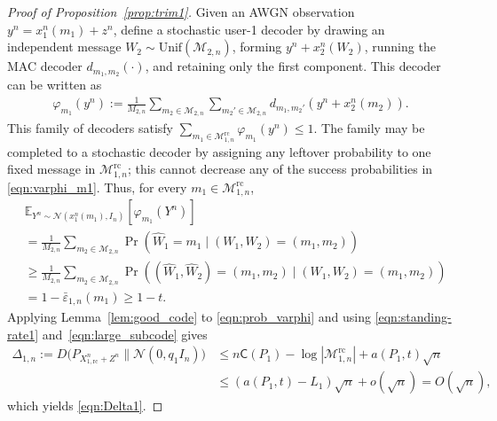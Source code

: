 \documentclass[11pt,onecolumn]{IEEEtran}
\newcommand{\nn}{\nonumber}
\newcommand{\calM}{\mathcal{M}}
\newcommand{\calN}{\mathcal{N}}
\newcommand{\bbE}{\mathbb{E}}
\newcommand{\rvC}{\mathsf{C}}
\newcommand{\eps}{\varepsilon}
\newcommand{\rc}{\mathrm{rc}}
\begin{document}
\begin{proof}[Proof of Proposition~\ref{prop:trim1}]
Given an AWGN observation $y^n=x_1^n(m_1)+z^n$, define a stochastic user-1 decoder by drawing an independent message $W_2\sim\mathrm{Unif}(\calM_{2,n})$, forming $y^n + x_2^n(W_2)$, running the MAC decoder $d_{m_1, m_2}(\cdot)$, and retaining only the first component. This decoder can be written as 
\begin{align}
\varphi_{m_1}(y^n):=\frac{1}{M_{2,n}}\sum_{m_2 \in \calM_{2,n}}\sum_{m_2' \in \calM_{2,n}}d_{m_1, m_2'}(y^n+x_2^n(m_2)). \label{eqn:varphi_m1}
\end{align}
This family of decoders satisfy $\sum_{m_1 \in \calM_{1,n}^\rc}\varphi_{m_1}(y^n)\le 1$. The family may be completed to a stochastic decoder by assigning any leftover probability to one fixed message in $\calM_{1,n}^\rc$; this cannot decrease any of the success probabilities in \eqref{eqn:varphi_m1}. Thus, for every $m_1 \in \calM_{1,n}^\rc$,
\begin{align}
&\bbE_{Y^n\sim\calN(x_1^n(m_1),I_n)}
       [\varphi_{m_1}(Y^n)]
\nonumber\\
&=
\frac{1}{M_{2,n}}
\sum_{m_2\in\calM_{2,n}}
\Pr\!\left(
\hat W_1=m_1
 \mid
(W_1,W_2)=(m_1,m_2)
\right)
\nonumber\\
&\ge
\frac{1}{M_{2,n}}
\sum_{m_2\in\calM_{2,n}}
\Pr\!\left(
(\hat W_1,\hat W_2)=(m_1,m_2)
\mid
(W_1,W_2)=(m_1,m_2)
\right)
\nonumber\\
&=
1-\bar{\eps}_{1,n}(m_1)
\ge 1-t.
\label{eqn:prob_varphi}
\end{align}
Applying Lemma~\ref{lem:good_code} to \eqref{eqn:prob_varphi} and using \eqref{eqn:standing-rate1} and~\eqref{eqn:large_subcode} gives
\begin{align}
\Delta_{1,n}:=D\big(P_{X_{1,\rc}^n+Z^n}\|\calN(0,q_1 I_n) \big) &\le n \rvC(P_1)-\log |\calM_{1,n}^\rc|+ a(P_1,t)\sqrt{n}\nn\\
&\le   (a(P_1,t)-L_1)\sqrt{n} + o(\sqrt{n})=O(\sqrt{n}),
\end{align}
which yields \eqref{eqn:Delta1}.


\end{proof}
\end{document}
